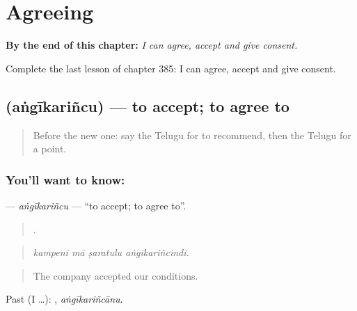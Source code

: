 
\chapter{Agreeing}
\label{ch:te-agreeing}

\begin{chapteropening}
\textbf{By the end of this chapter:} \emph{I can agree, accept and give consent.}

Complete the last lesson of chapter 385: I can agree, accept and give consent.
\end{chapteropening}

\section[\texorpdfstring{\te{అంగీకరించు} (aṅgīkariñcu)}{అంగీకరించు (aṅgīkariñcu)}]{ (aṅgīkariñcu) — to accept; to agree to}

\label{lesson:TE-C385-angikarincu}



\begin{quote}
Before the new one: say the Telugu for to recommend, then the Telugu for a point.
\end{quote}

\subsection*{You'll want to know: }
\textbf{} — \emph{aṅgīkariñcu} — \textquotedblleft{}to accept; to agree to\textquotedblright{}.

\begin{quote}
   .
\end{quote}

\begin{quote}
\emph{kampenī mā ṣaratulu aṅgīkariñcindi.}
\end{quote}

\begin{quote}
The company accepted our conditions.
\end{quote}

Past (I …): , \emph{aṅgīkariñcānu}.

